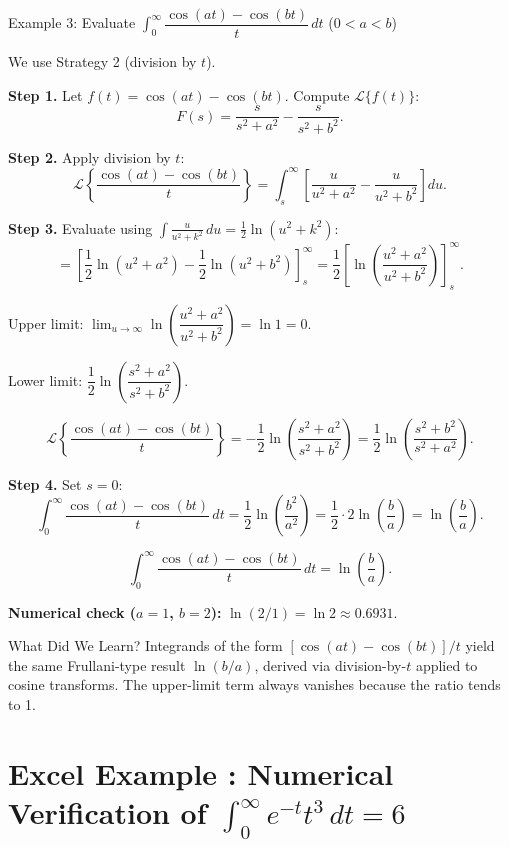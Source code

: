 \documentclass[12pt,a4paper]{article}
\begin{document}
\begin{infobox}{Example 3: Evaluate $\displaystyle\int_0^\infty
    \dfrac{\cos(at)-\cos(bt)}{t}\, dt$ \quad ($0 < a < b$)}

We use Strategy 2 (division by $t$).

\textbf{Step 1.} Let $f(t) = \cos(at) - \cos(bt)$. Compute $\mathcal{L}\{f(t)\}$:
\[
  F(s) = \frac{s}{s^2+a^2} - \frac{s}{s^2+b^2}.
\]

\textbf{Step 2.} Apply division by $t$:
\[
  \mathcal{L}\!\left\{\frac{\cos(at)-\cos(bt)}{t}\right\}
  = \int_s^\infty \left[\frac{u}{u^2+a^2} - \frac{u}{u^2+b^2}\right] du.
\]

\textbf{Step 3.} Evaluate using $\int \frac{u}{u^2+k^2}\,du = \frac{1}{2}\ln(u^2+k^2)$:
\[
  = \left[\frac{1}{2}\ln(u^2+a^2) - \frac{1}{2}\ln(u^2+b^2)\right]_s^\infty
  = \frac{1}{2}\left[\ln\!\left(\frac{u^2+a^2}{u^2+b^2}\right)\right]_s^\infty.
\]

Upper limit: $\lim_{u\to\infty}\ln\!\left(\dfrac{u^2+a^2}{u^2+b^2}\right) = \ln 1 = 0$.

Lower limit: $\dfrac{1}{2}\ln\!\left(\dfrac{s^2+a^2}{s^2+b^2}\right)$.

\[
  \mathcal{L}\!\left\{\frac{\cos(at)-\cos(bt)}{t}\right\}
  = -\frac{1}{2}\ln\!\left(\frac{s^2+a^2}{s^2+b^2}\right)
  = \frac{1}{2}\ln\!\left(\frac{s^2+b^2}{s^2+a^2}\right).
\]

\textbf{Step 4.} Set $s = 0$:
\[
  \int_0^\infty \frac{\cos(at)-\cos(bt)}{t}\, dt
  = \frac{1}{2}\ln\!\left(\frac{b^2}{a^2}\right)
  = \frac{1}{2}\cdot 2\ln\!\left(\frac{b}{a}\right)
  = \ln\!\left(\frac{b}{a}\right).
\]

\[
  \boxed{\int_0^\infty \frac{\cos(at)-\cos(bt)}{t}\, dt = \ln\!\left(\frac{b}{a}\right).}
\]

\textbf{Numerical check ($a=1$, $b=2$):}
$\ln(2/1) = \ln 2 \approx 0.6931$.

\end{infobox}

\begin{learnbox}{What Did We Learn?}
Integrands of the form $[\cos(at) - \cos(bt)]/t$ yield the same Frullani-type
result $\ln(b/a)$, derived via division-by-$t$ applied to cosine transforms.
The upper-limit term always vanishes because the ratio tends to 1.
\end{learnbox}

\section{Excel Example : Numerical Verification of
         $\int_0^\infty e^{-t} t^3\, dt = 6$}
\end{document}
